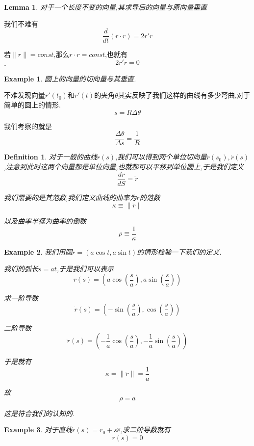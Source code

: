 \documentclass[11pt,hyperref,a4paper,UTF8]{ctexart}
\newtheorem{lemma}{Lemma}[subsection]
\newtheorem{example}{Example}[subsection]
\newtheorem{definition}{Definition}[subsection]
\newenvironment{cproof}{%
\heiti{证明}\kaishu
}{%
  \hfill $\square$
  \par\bigskip
}
\newcommand{\parameter}[1]{\left(#1\right)}
\begin{document}
\begin{CJK}{UTF8}{gkai}
\begin{lemma}
  对于一个长度不变的向量,其求导后的向量与原向量垂直
\end{lemma}

\begin{cproof}
  
我们不难有
\[\frac{d}{dt}(r \cdot r) = 2r' r\]

若$\|r\| = const$,那么$r \cdot r = const$,也就有
\[2r' r = 0\]
\end{cproof}

\begin{example}
  圆上的向量的切向量与其垂直.
\end{example}

不难发现向量$r'(t_0)$和$r'(t)$的夹角$\theta$其实反映了我们这样的曲线有多少弯曲,对于简单的圆上的情形.
\[s = R \Delta \theta\]

我们考察的就是
\[\frac{\Delta \theta}{\Delta s} = \frac{1}{R}\]

\begin{definition}
  对于一般的曲线$r(s)$,我们可以得到两个单位切向量$\dot{r}(s_0),\dot{r}(s)$,注意到此时这两个向量都是单位向量,也就都可以平移到单位圆上,于是我们定义
  \[\frac{d \dot{r}}{dS} = \ddot{r}\]

  我们需要的是其范数,我们定义曲线的曲率为$\ddot{r}$的范数
  \[\kappa \equiv \|\ddot{r}\|\]

  以及曲率半径为曲率的倒数
  \[\rho \equiv \frac{1}{\kappa}\]
\end{definition}

\begin{example}
  我们用圆$r = (a\cos t,a\sin t)$的情形检验一下我们的定义.

  我们的弧长$s = at$,于是我们可以表示
  \[r(s) = \parameter{a \cos \parameter{\frac{s}{a}},a \sin \parameter{\frac{s}{a}}}\]

  求一阶导数
  \[\dot{r}(s) = \parameter{- \sin \parameter{\frac{s}{a}}, \cos \parameter{\frac{s}{a}}}\]

  二阶导数
  \[\ddot{r}(s) = \parameter{- \frac{1}{a}\cos \parameter{\frac{s}{a}}, - \frac{1}{a}\sin \parameter{\frac{s}{a}}}\]

  于是就有
  \[\kappa = \|\ddot{r}\| = \frac{1}{a}\]

  故
  \[\rho = a\]

  这是符合我们的认知的.
\end{example}

\begin{example}
  对于直线$r(s) = r_0 + s \hat{e}$,求二阶导数就有
  \[\ddot{r}(s) = 0\]


\end{example}
\end{CJK}
\end{document}

